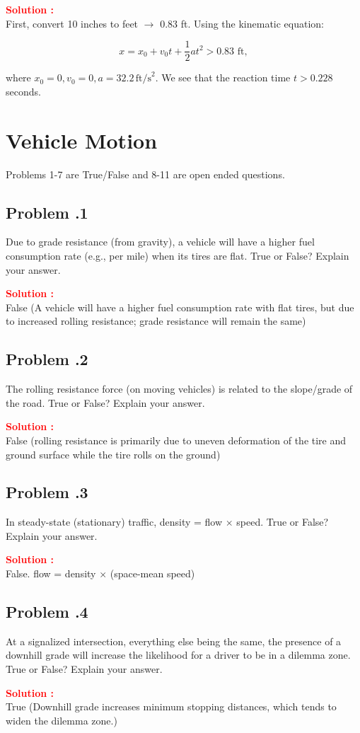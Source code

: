 \documentclass[12pt]{article}
\newcommand{\customsubsection}[1]{
  \subsection*{Problem \thesection.#1}
}
\begin{document}
\textbf{\textcolor{red}{Solution :}} \\
First, convert 10 inches to feet $\rightarrow$ 0.83 ft. Using the kinematic equation:

\[
x = x_0 + v_0 t + \frac{1}{2}at^2 > 0.83 \text{ ft},
\]

where \(x_0=0, v_0=0, a = 32.2 \, \text{ft/s}^2\). We see that the reaction time $t >0.228$ seconds.

\newpage


\section{Vehicle Motion}
Problems 1-7 are True/False and 8-11 are open ended questions.


\customsubsection{1}
Due to grade resistance (from gravity), a vehicle will have a higher fuel consumption rate (e.g., per mile) when its tires are flat. True or False? Explain your answer.


\textbf{\textcolor{red}{Solution :}} \\
False (A vehicle will have a higher fuel consumption rate with flat tires, but due to increased rolling resistance; grade resistance will remain the same)
\newpage

\customsubsection{2}
The rolling resistance force (on moving vehicles) is related to the slope/grade of the road. True or False? Explain your answer.


\textbf{\textcolor{red}{Solution :}} \\
False (rolling resistance is primarily due to uneven deformation of the tire and ground surface while the tire rolls on the ground)  
\newpage

\customsubsection{3}
In steady-state (stationary) traffic, density = flow $\times$ speed. True or False? Explain your answer. 


\textbf{\textcolor{red}{Solution :}} \\
False. flow = density $\times$ (space-mean speed) 
\newpage


\customsubsection{4}
At a signalized intersection, everything else being the same, the presence of a downhill grade will increase the likelihood for a driver to be in a dilemma zone. True or False? Explain your answer. 


\textbf{\textcolor{red}{Solution :}} \\
True (Downhill grade increases minimum stopping distances, which tends to widen the dilemma zone.)

\newpage
\end{document}

